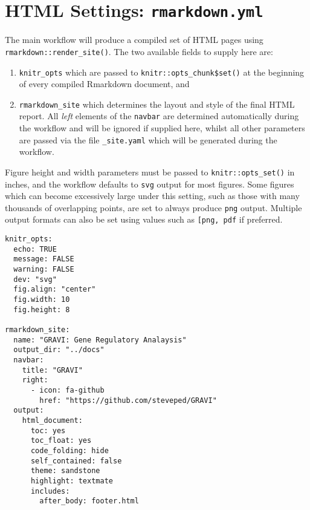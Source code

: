 \documentclass[
]{book}
\providecommand{\tightlist}{%
  \setlength{\itemsep}{0pt}\setlength{\parskip}{0pt}}
\begin{document}
\hypertarget{rmarkdown-yml}{%
\section{\texorpdfstring{HTML Settings: \texttt{rmarkdown.yml}}{HTML Settings: rmarkdown.yml}}\label{rmarkdown-yml}}

The main workflow will produce a compiled set of HTML pages using \texttt{rmarkdown::render\_site()}\citep{R-rmarkdown}.
The two available fields to supply here are:

\begin{enumerate}
\def\labelenumi{\arabic{enumi}.}
\tightlist
\item
  \texttt{knitr\_opts} which are passed to \texttt{knitr::opts\_chunk\$set()}\citep{R-knitr} at the beginning of every compiled Rmarkdown document, and
\item
  \texttt{rmarkdown\_site} which determines the layout and style of the final HTML report.
  All \emph{left} elements of the \texttt{navbar} are determined automatically during the workflow and will be ignored if supplied here, whilst all other parameters are passed via the file \texttt{\_site.yaml} which will be generated during the workflow.
\end{enumerate}

Figure height and width parameters must be passed to \texttt{knitr::opts\_set()} in inches, and the workflow defaults to \texttt{svg} output for most figures.
Some figures which can become excessively large under this setting, such as those with many thousands of overlapping points, are set to always produce \texttt{png} output.
Multiple output formats can also be set using values such as \texttt{{[}\textquotesingle{}png\textquotesingle{},\ \textquotesingle{}pdf\textquotesingle{}{]}} if preferred.

\begin{verbatim}
knitr_opts:
  echo: TRUE
  message: FALSE
  warning: FALSE
  dev: "svg"
  fig.align: "center"
  fig.width: 10
  fig.height: 8

rmarkdown_site:
  name: "GRAVI: Gene Regulatory Analaysis"
  output_dir: "../docs"
  navbar:
    title: "GRAVI"
    right:
      - icon: fa-github
        href: "https://github.com/steveped/GRAVI"
  output:
    html_document:
      toc: yes
      toc_float: yes
      code_folding: hide
      self_contained: false
      theme: sandstone
      highlight: textmate
      includes:
        after_body: footer.html
\end{verbatim}

  
\end{document}
